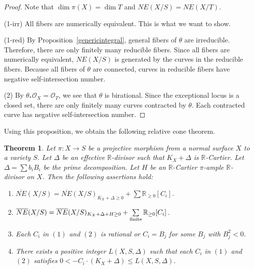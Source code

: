 \documentclass[12pt,twoside]{amsart}
\newtheorem{thm}{Theorem}[section]
\theoremstyle{definition}
\newcommand{\neb}{\overline{NE}}
\begin{document}
\begin{proof}
Note that $\dim \pi(X)=\dim T$ and $NE(X/S)=NE(X/T)$. 

(1-irr) 
All fibers are numerically equivalent. 
This is what we want to show. 

(1-red) 
By Proposition~\ref{genericintegral}, 
general fibers of $\theta$ are irreducible. 
Therefore, there are only finitely many reducible fibers. 
Since all fibers are numerically equivalent, 
$NE(X/S)$ is generated by the curves in the reducible fibers. 
Because all fibers of $\theta$ are connected, 
curves in reducible fibers have negative 
self-intersection number.  

(2) 
By $\theta_*\mathcal{O}_X=\mathcal{O}_T$, 
we see that $\theta$ is birational. 
Since the exceptional locus is a closed set, 
there are only finitely many curves contracted by $\theta$. 
Each contracted curve has negative self-intersection number. 
\end{proof}

Using this proposition, we obtain the following relative cone theorem. 

\begin{thm}\label{relct}
Let $\pi:X \to S$ be a projective morphism 
from a normal surface $X$ to a variety $S$.
Let $\Delta$ be an effective $\mathbb{R}$-divisor 
such that $K_X+\Delta$ is $\mathbb{R}$-Cartier. 
Let $\Delta=\sum b_iB_i$ be the prime decomposition. 
Let $H$ be an $\mathbb{R}$-Cartier 
$\pi$-ample $\mathbb{R}$-divisor on $X$. 
Then the following assertions hold{\em{:}}

\begin{enumerate}

\item{
$
\neb(X/S)=
\neb(X/S)_{K_X+\Delta \geq 0}+
\sum{\mathbb{R}_{\geq 0}[C_i]}
$.}
\item{
$
\neb(X/S)=
\neb(X/S)_{K_X+\Delta+H \geq 0}+
\sum\limits_{\rm finite}{\mathbb{R}_{\geq 0}[C_i]}
$.}
\item{Each $C_i$ in $(1)$ and $(2)$ is rational or 
$C_i=B_j$ for some $B_j$ with $B_j^2<0$.}
\item{There exists a positive integer $L(X, S, \Delta)$ 
such that each $C_i$ in $(1)$ and $(2)$ 
satisfies $0<-C_i\cdot (K_X+\Delta) \leq L(X, S, \Delta)$.}
\end{enumerate}
\end{thm}
\end{document}
